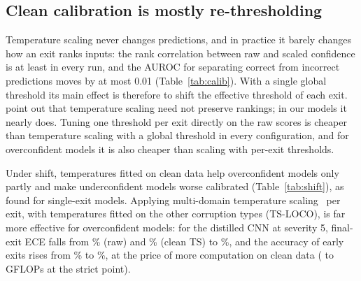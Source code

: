 \documentclass[10pt]{article}
\begin{document}
\subsection{Clean calibration is mostly re-thresholding}\label{sec:calib}
Temperature scaling never changes predictions, and in practice it barely changes how an exit ranks inputs: the rank
correlation between raw and scaled confidence is at least \minrankcorr{} in every run, and the AUROC for separating
correct from incorrect predictions moves by at most 0.01 (Table~\ref{tab:calib}). With a single global threshold its
main effect is therefore to shift the effective threshold of each exit. \citet{kubaty2025rethinking} point out that
temperature scaling need not preserve rankings; in our models it nearly does. Tuning one threshold per exit directly on the
raw scores is cheaper than temperature scaling with a global threshold in every configuration, and for overconfident
models it is also cheaper than scaling with per-exit thresholds.

Under shift, temperatures fitted on clean data help overconfident models only partly and make underconfident models
worse calibrated (Table~\ref{tab:shift}), as \citet{ovadia2019trust} found for single-exit models. Applying
multi-domain temperature scaling~\citep{yu2022multidomain,gong2021confidence} per exit, with temperatures fitted on the
other corruption types (TS-LOCO), is far more effective for overconfident models: for the distilled CNN at severity 5, final-exit ECE falls from \cnnkdeceraw\%
(raw) and \cnnkdecets\% (clean TS) to \cnnkdeceloco\%, and the accuracy of early exits rises from \cnnkdprec\% to
\cnnkdprecloco\%, at the price of more computation on clean data (\cnnkdcost{} to \cnnkdcostloco{} GFLOPs at the
strict point).

\begin{table}[t]
\centering\small
\caption{Temperature scaling (TS) barely re-ranks inputs ($\rho_s$: rank correlation of raw and scaled confidence;
AUROC of confidence for correctness, raw / TS), and per-exit thresholds on raw scores beat a global threshold after
TS.}
\label{tab:calib}
\resizebox{\linewidth}{!}{}
\end{table}

\begin{table}[t]
\centering\small
\caption{Calibration under shift. TS uses temperatures fitted on clean validation data; TS-LOCO pools clean
validation data with the five other corruption types. Last column: clean GFLOPs at the strict point, raw / TS-LOCO.}
\label{tab:shift}
\resizebox{\linewidth}{!}{}
\end{table}
\end{document}
